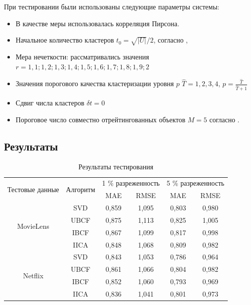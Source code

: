 \documentclass[a4paper, 12pt]{article} %
\begin{document}
При тестировании были использованы следующие параметры системы: 
\begin{itemize}
\item В качестве меры использовалась корреляция Пирсона.
\item Начальное количество кластеров $t_{0} = \sqrt{|U|} / 2$, согласно \cite{bees}, 
\item Мера нечеткости: рассматривались значения $r = 1,1; 1,2; 1,3; 1,4; 1,5; 1,6; 1,7; 1,8; 1,9; 2$
\item Значения порогового качества кластеризации уровня $p$ $\hat{T} = 1, 2, 3, 4$, $p=\frac{\hat{T}}{\hat{T} + 1}$ 
\item Сдвиг числа кластеров $\delta t = 0$
\item Пороговое число совместно отрейтингованных объектов $M = 5$ согласно \cite{itercf}.
\end{itemize}

\subsection{Результаты}


\begin{table}[h!]
	\begin{center}
		\begin{tabular}{|c|c|c|c|c|c|}
		\hline
		
		 \multirow{2}{*}{Тестовые данные}  & \multirow{2}{*}{Алгоритм}  & \multicolumn{2}{|c|}{ 1 \% разреженность} & \multicolumn{2}{|c|}{ 5 \% разреженность} \\
		 
		 \cline{3-6} &  & MAE & RMSE & MAE & RMSE \\
		 \hline
		 \multirow{4}{*}{MovieLens}  & SVD & 0,859 & 1,095 & 0,803 & 0,980 \\

		 \cline{2-6} & UBCF & 0,875 & 1,113 & 0,825  & 1,005\\

		 \cline{2-6} & IBCF & 0,867 & 1,099 & 0,817 &  0,998 \\ 

		 \cline{2-6} & IICA & 0,848 & 1,068 & 0,809 & 0,982 \\
		 \hline
 		 \multirow{4}{*}{Netflix} & SVD & 0,843 & 1,053 & 0,786 & 0,964 \\
 		 \cline{2-6} & UBCF & 0,861 & 1,066 & 0,804  & 0,982\\
		 \cline{2-6} & IBCF & 0,852 & 1,060 & 0,793 &  0,969 \\  		
 	     \cline{2-6} & IICA & 0,836 & 1,041 & 0,801 & 0,973 \\
		 \hline
		 
		\end{tabular}
		
	\end{center}
		\caption{Результаты тестирования}
		\label{tab:res}
	\end{table}
	
\end{document}
